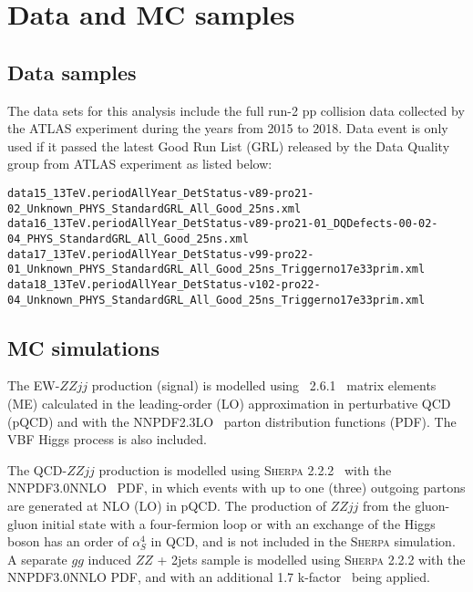 \section{Data and MC samples}

\subsection{Data samples}
\label{sec:vbszz_data}

The data sets for this analysis include the full run-2 pp collision data collected by the ATLAS experiment during the years from 2015 to 2018.
Data event is only used if it passed the latest Good Run List (GRL) released by the Data Quality group from ATLAS experiment as listed below:


{\tiny
\begin{verbatim}
data15_13TeV.periodAllYear_DetStatus-v89-pro21-02_Unknown_PHYS_StandardGRL_All_Good_25ns.xml
data16_13TeV.periodAllYear_DetStatus-v89-pro21-01_DQDefects-00-02-04_PHYS_StandardGRL_All_Good_25ns.xml
data17_13TeV.periodAllYear_DetStatus-v99-pro22-01_Unknown_PHYS_StandardGRL_All_Good_25ns_Triggerno17e33prim.xml
data18_13TeV.periodAllYear_DetStatus-v102-pro22-04_Unknown_PHYS_StandardGRL_All_Good_25ns_Triggerno17e33prim.xml
\end{verbatim}
}

\subsection{MC simulations}
\label{sec:mc}

The EW-$ZZjj$ production (signal) is modelled using \MGMCatNLO~2.6.1~\cite{Alwall:2014hca} matrix elements (ME) calculated in the leading-order (LO) approximation
in perturbative QCD (pQCD) and with the NNPDF2.3LO~\cite{Ball:2012cx} parton distribution functions (PDF).
The VBF Higgs process is also included.

The QCD-$ZZjj$ production is modelled using \textsc{Sherpa} 2.2.2~\cite{Gleisberg:2008ta} with the NNPDF3.0NNLO~\cite{ball2015parton} PDF,
in which events with up to one (three) outgoing partons are generated at NLO (LO) in pQCD.
The production of $ZZjj$ from the gluon-gluon initial state with a four-fermion loop or with an exchange of the Higgs boson has an order of $\alpha_{S}^{4}$ in QCD,
and is not included in the \textsc{Sherpa} simulation.
A separate $gg$ induced $ZZ$ + 2jets sample is modelled using \textsc{Sherpa} 2.2.2 with the NNPDF3.0NNLO PDF,
and with an additional 1.7 k-factor~\cite{PhysRevD.92.094028} being applied.

